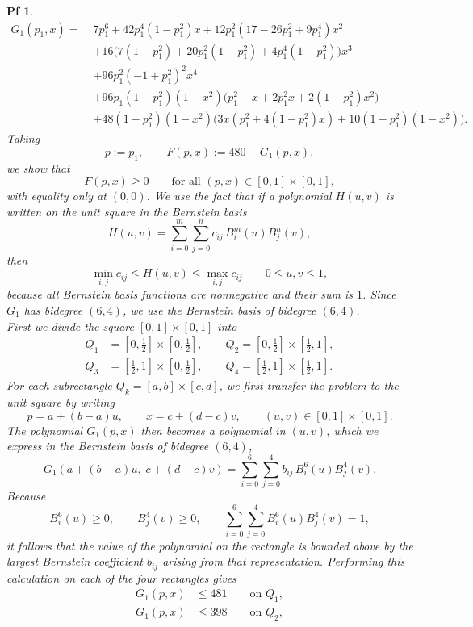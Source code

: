 \documentclass[10pt,a4paper]{amsart}
\newtheorem{pf}{Pf}
\begin{document}
\begin{pf}
\[
\begin{aligned}
G_1(p_1,x)=\;&7 p_1^6 + 42 p_1^4 (1-p_1^2)x + 12 p_1^2(17-26p_1^2+9p_1^4)x^2 \\
&+16\bigl(7(1-p_1^2)+20p_1^2(1-p_1^2)+4p_1^4(1-p_1^2)\bigr)x^3 \\
&+96p_1^2(-1+p_1^2)^2x^4 \\
&+96p_1(1-p_1^2)(1-x^2)\bigl(p_1^2+x+2p_1^2x+2(1-p_1^2)x^2\bigr) \\
&+48(1-p_1^2)(1-x^2)\bigl(3x(p_1^2+4(1-p_1^2)x)+10(1-p_1^2)(1-x^2)\bigr).
\end{aligned}
\]
Taking
\[
p:=p_1,
\qquad
F(p,x):=480-G_1(p,x),
\]
we show that
\[
F(p,x)\ge 0
\qquad \text{for all }(p,x)\in[0,1]\times[0, 1],
\]
with equality only at $(0,0)$.
We use the fact that if a polynomial $H(u,v)$ is written on the unit square in the  Bernstein basis
\[
H(u,v)=\sum_{i=0}^{m}\sum_{j=0}^{n} c_{ij}\,B_i^m(u)B_j^n(v),
\]
then
\[
\min_{i,j} c_{ij}\le H(u,v)\le \max_{i,j} c_{ij}
\qquad 0\le u,v\le 1,
\]
because all Bernstein basis functions are nonnegative and their sum is $1$.
Since $G_1$ has bidegree $(6,4)$, we use the  Bernstein basis of bidegree $(6,4)$.\\[2mm]
First we divide the square \([0, 1]\times[0, 1]\) into
\begin{align*}
Q_1&=\left[0,\frac12\right]\times\left[0,\frac12\right],\qquad
Q_2=\left[0,\frac12\right]\times\left[\frac12,1\right],\\[3mm]
Q_3&=\left[\frac12,1\right]\times\left[0,\frac12\right],\qquad
Q_4=\left[\frac12,1\right]\times\left[\frac12,1\right].
\end{align*}
For each subrectangle \(Q_k=[a,b]\times[c,d]\), we first transfer the problem to the unit square by writing
\[
p=a+(b-a)u,\qquad x=c+(d-c)v,\qquad (u,v)\in[0, 1]\times[0, 1].
\]
The polynomial \(G_1(p,x)\) then becomes a polynomial in \((u,v)\), which we express in the Bernstein basis of bidegree \((6,4)\),
\[
G_1(a+(b-a)u,\;c+(d-c)v)
=
\sum_{i=0}^{6}\sum_{j=0}^{4} b_{ij}\,B_i^6(u)B_j^4(v).
\]
Because
\[
B_i^6(u)\ge 0,\qquad B_j^4(v)\ge 0,
\qquad
\sum_{i=0}^{6}\sum_{j=0}^{4} B_i^6(u)B_j^4(v)=1,
\]
it follows that the value of the polynomial on the rectangle is bounded above by the largest Bernstein coefficient \(b_{ij}\) arising from that representation. Performing this calculation on each of the four rectangles gives
\begin{align*}
G_1(p,x) &\le 481 \qquad \text{on } Q_1,\\[2mm]
G_1(p,x) &\le 398 \qquad \text{on } Q_2,\\[2mm]

\end{align*}
\end{pf}
\end{document}
